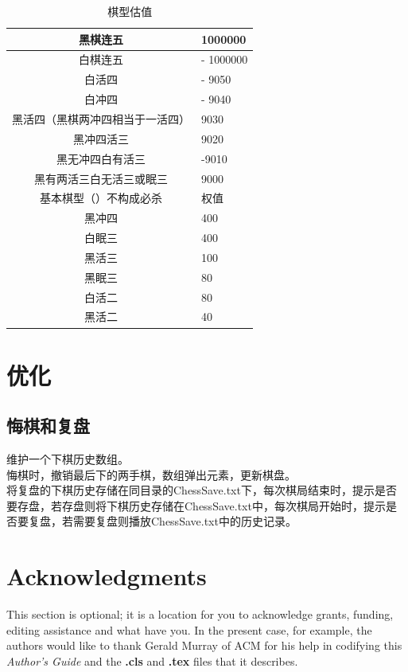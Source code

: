 \documentclass{acm_proc_article-sp}
\begin{document}
\begin{table}
	\centering
	\caption{棋型估值}
	\begin{tabular}{|c|l|} \hline
	黑棋连五 & 1000000 \\ \hline
	 白棋连五 &- 1000000 \\ \hline
	 白活四 &- 9050 \\ \hline
	 白冲四 &- 9040 \\ \hline
	 黑活四（黑棋两冲四相当于一活四） &9030 \\ \hline
	 黑冲四活三& 9020 \\ \hline
	 黑无冲四白有活三 &-9010\\ \hline
	 
	 黑有两活三白无活三或眠三& 9000 \\ \hline
	基本棋型（）不构成必杀 &  权值\\ \hline
	 黑冲四 &  400\\ \hline
	 白眠三 &  400\\ \hline
	 黑活三 &  100\\ \hline
     黑眠三 &  80\\ \hline
     白活二    &  80\\ \hline
     黑活二     &  40\\ \hline
	\end{tabular}
\end{table}
\section{优化}
\subsection{悔棋和复盘}
维护一个下棋历史数组。\\
悔棋时，撤销最后下的两手棋，数组弹出元素，更新棋盘。\\
将复盘的下棋历史存储在同目录的ChessSave.txt下，每次棋局结束时，提示是否要存盘，若存盘则将下棋历史存储在ChessSave.txt中，每次棋局开始时，提示是否要复盘，若需要复盘则播放ChessSave.txt中的历史记录。\\
\section{Acknowledgments}
This section is optional; it is a location for you
to acknowledge grants, funding, editing assistance and
what have you.  In the present case, for example, the
authors would like to thank Gerald Murray of ACM for
his help in codifying this \textit{Author's Guide}
and the \textbf{.cls} and \textbf{.tex} files that it describes.
\end{document}
